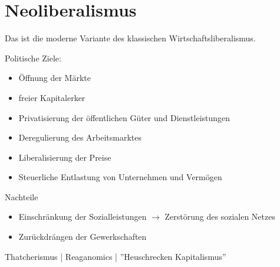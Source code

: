 \documentclass[a4paper]{report}
\begin{document}
\chapter{Neoliberalismus}
Das ist die moderne Variante des klassischen Wirtschaftsliberalismus.

Politische Ziele:

\begin{itemize}
\item Öffnung der Märkte 
\item freier Kapitalerker
\item Privatisierung der öffentlichen Güter und Dienstleistungen
\item Deregulierung des Arbeitsmarktes
\item Liberalisierung der Preise
\item Steuerliche Entlastung von Unternehmen und Vermögen
\end{itemize}

Nachteile

\begin{itemize}
\item Einschränkung der Sozialleistungen $\rightarrow$ Zerstörung des sozialen Netzes
\item Zurückdrängen der Gewerkschaften
\end{itemize}

Thatcherismus | Reaganomics | ''Heuschrecken Kapitalismus''
\end{document}
